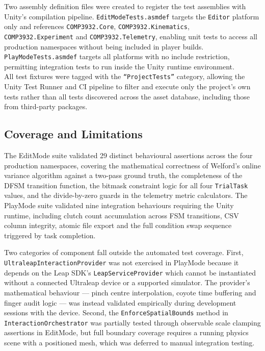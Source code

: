 Two assembly definition files were created to register the test assemblies with Unity's compilation pipeline. \texttt{EditModeTests.asmdef} targets the \texttt{Editor} platform only and references \texttt{COMP3932.Core}, \texttt{COMP3932.Kinematics}, \texttt{COMP3932.Experiment} and \texttt{COMP3932.Telemetry}, enabling unit tests to access all production namespaces without being included in player builds. \texttt{PlayModeTests.asmdef} targets all platforms with no include restriction, permitting integration tests to run inside the Unity runtime environment. \\

All test fixtures were tagged with the \texttt{``ProjectTests''} category, allowing the Unity Test Runner and CI pipeline to filter and execute only the project's own tests rather than all tests discovered across the asset database, including those from third-party packages.


\subsection{Coverage and Limitations}
\label{sec:test_coverage}

The EditMode suite validated 29 distinct behavioural assertions across the four production namespaces, covering the mathematical correctness of Welford's online variance algorithm against a two-pass ground truth, the completeness of the DFSM transition function, the bitmask constraint logic for all four \texttt{TrialTask} values, and the divide-by-zero guards in the telemetry metric calculators. The PlayMode suite validated nine integration behaviours requiring the Unity runtime, including clutch count accumulation across FSM transitions, CSV column integrity, atomic file export and the full condition swap sequence triggered by task completion.

Two categories of component fall outside the automated test coverage. First, \texttt{UltraleapInteractionProvider} was not exercised in PlayMode because it depends on the Leap SDK's \texttt{LeapServiceProvider} which cannot be instantiated without a connected Ultraleap device or a supported simulator. The provider's mathematical behaviour --- pinch centre interpolation, coyote time buffering and finger audit logic --- was instead validated empirically during development sessions with the device. Second, the \texttt{EnforceSpatialBounds} method in \texttt{InteractionOrchestrator} was partially tested through observable scale clamping assertions in EditMode, but full boundary coverage requires a running physics scene with a positioned mesh, which was deferred to manual integration testing.

